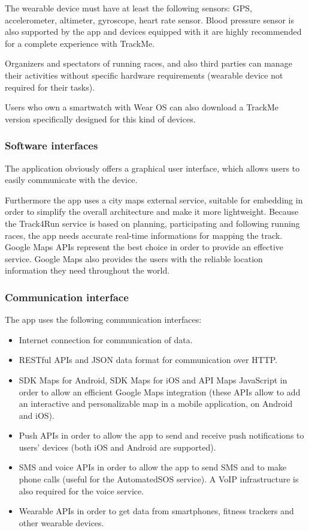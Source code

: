 The wearable device must have at least the following sensors: GPS, accelerometer, altimeter, gyroscope, heart rate sensor. Blood pressure sensor is also supported by the app and devices equipped with it are highly recommended for a complete experience with TrackMe.

Organizers and spectators of running races, and also third parties can manage their activities without specific hardware requirements (wearable device not required for their tasks).

Users who own a smartwatch with Wear OS can also download a TrackMe version specifically designed for this kind of devices.

\subsubsection{Software interfaces}
The application obviously offers a graphical user interface, which allows users to easily communicate with the device.

Furthermore the app uses a city maps external service, suitable for embedding in order to simplify the overall architecture and make it more lightweight. Because the Track4Run service is based on planning, participating and following running races, the app needs accurate real-time informations for mapping the track. Google Maps APIs represent the best choice in order to provide an effective service. Google Maps also provides the users with the reliable location information they need throughout the world.

\subsubsection{Communication interface}
The app uses the following communication interfaces:
\begin{itemize}
\item Internet connection for communication of data.
\item RESTful APIs and JSON data format for communication over HTTP.
\item SDK Maps for Android, SDK Maps for iOS and API Maps JavaScript in order to allow an efficient Google Maps integration (these APIs allow to add an interactive and personalizable map in a mobile application, on Android and iOS).
\item Push APIs in order to allow the app to send and receive push notifications to users' devices (both iOS and Android are supported).
\item SMS and voice APIs in order to allow the app to send SMS and to make phone calls (useful for the AutomatedSOS service). A VoIP infrastructure is also required for the voice service.
\item Wearable APIs in order to get data from smartphones, fitness trackers and other wearable devices.
\end{itemize}

